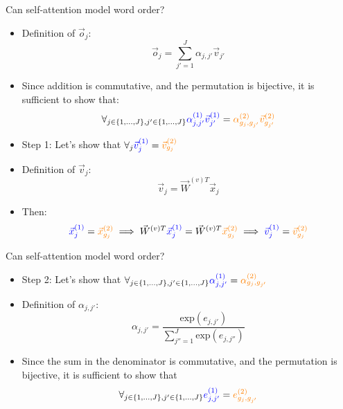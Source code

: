 
\begin{vbframe}{Can self-attention model word order?}

\vfill

\begin{itemize}
\item Definition of $\vec o_j$:
$$\vec o_j = \sum_{j'=1}^J \alpha_{j,j'} \vec v_{j'}$$
\item Since addition is commutative, and the permutation is bijective, it is sufficient to show that:
$$\forall_{j \in \{1,...,J\}, j' \in \{1,...,J\}} \textcolor{blue}{\alpha^{(1)}_{j,j'} \vec v^{(1)}_{j'}} = \textcolor{orange}{\alpha^{(2)}_{g_j,g_{j'}} \vec v^{(2)}_{g_{j'}}}$$
\item Step 1: Let's show that $\forall_{j} \textcolor{blue}{\vec v^{(1)}_{j}} = \textcolor{orange}{\vec v^{(2)}_{g_{j}}}$
\item Definition of $\vec v_j$:
$$\vec v_j = \vec W^{(v)T} \vec x_j$$
\item Then:
$$\textcolor{blue}{\vec x^{(1)}_{j}} = \textcolor{orange}{\vec x^{(2)}_{g_{j}}} \implies \vec W^{(v)T} \textcolor{blue}{\vec x^{(1)}_{j}} = \vec W^{(v)T} \textcolor{orange}{\vec x^{(2)}_{g_{j}}} \implies \textcolor{blue}{\vec v^{(1)}_j} = \textcolor{orange}{\vec v^{(2)}_{g_j}}$$
\end{itemize}

\vfill

\end{vbframe}


\begin{vbframe}{Can self-attention model word order?}

\vfill

\begin{itemize}
\item Step 2: Let's show that $\forall_{j \in \{1,...,J\}, j' \in \{1,...,J\}} \textcolor{blue}{\alpha^{(1)}_{j, j'}} = \textcolor{orange}{\alpha^{(2)}_{g_j, g_{j'}}}$
\item Definition of $\alpha_{j,j'}$:
$$\alpha_{j,j'} = \frac{\mathrm{exp}(e_{j,j'})}{\sum_{j''=1}^J \mathrm{exp}(e_{j,j''})}$$
\item Since the sum in the denominator is commutative, and the permutation is bijective, it is sufficient to show that
$$\forall_{j \in \{1,...,J\}, j' \in \{1,...,J\}} \textcolor{blue}{e^{(1)}_{j,j'}} = \textcolor{orange}{e^{(2)}_{g_j, g_{j'}}}$$
\end{itemize}

\vfill

\end{vbframe}

